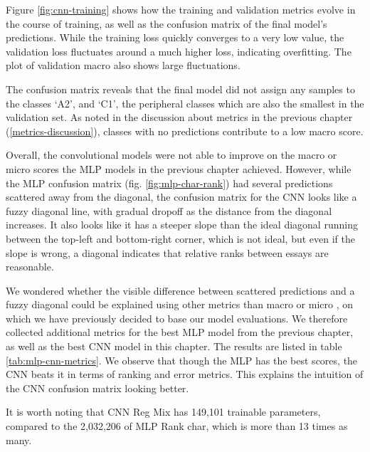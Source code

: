 Figure \ref{fig:cnn-training} shows how the training and validation metrics
evolve in the course of training, as well as the confusion matrix of the
final model's predictions. While the training loss quickly converges to a
very low value, the validation loss fluctuates around a much higher loss,
indicating overfitting. The plot of validation macro \FI also shows large
fluctuations.

The confusion matrix reveals that the final model did not assign any samples
to the classes `A2', and `C1', the peripheral classes which are also the
smallest in the validation set. As noted in the discussion about metrics in
the previous chapter (\ref{metrics-discussion}), classes with no predictions
contribute to a low macro \FI score.

Overall, the convolutional models were not able to improve on the macro or
micro \FI scores the \ac{MLP} models in the previous chapter achieved.
However, while the \ac{MLP} confusion matrix (fig. \ref{fig:mlp-char-rank})
had several predictions scattered away from the diagonal, the confusion
matrix for the \ac{CNN} looks like a fuzzy diagonal line, with gradual
dropoff as the distance from the diagonal increases. It also looks like it
has a steeper slope than the ideal diagonal running between the top-left and
bottom-right corner, which is not ideal, but even if the slope is wrong, a
diagonal indicates that relative ranks between essays are reasonable.

We wondered whether the visible difference between scattered predictions and
a fuzzy diagonal could be explained using other metrics than macro or micro
\FI, on which we have previously decided to base our model evaluations. We
therefore collected additional metrics for the best MLP model from the
previous chapter, as well as the best CNN model in this chapter. The results
are listed in table \ref{tab:mlp-cnn-metrics}. We observe that though the
\ac{MLP} has the best \FI scores, the \ac{CNN} beats it in terms of ranking
and error metrics. This explains the intuition of the CNN confusion matrix
looking better.

It is worth noting that CNN Reg Mix has 149,101 trainable parameters, compared
to the 2,032,206 of MLP Rank char, which is more than 13 times as many.

